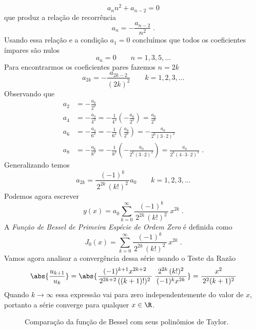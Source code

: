 \begin{example}
  \[
    a_n n^2 + a_{n-2} = 0
  \]
  que produz a relação de recorrência
  \[
    a_n = -\frac{a_{n-2}}{n^2} \;.
  \]
  Usando essa relação e a condição $a_1 = 0$ concluímos que todos
  os coeficientes ímpares são nulos
  \[
    a_n = 0 \qquad n = 1, 3, 5, \dots
  \]
  Para encontrarmos os coeficientes pares fazemos $n=2k$
  \[
    a_{2k} = -\frac{a_{2k-2}}{(2k)^2} \qquad k = 1, 2, 3, \dots
  \]
  Observando que
  \begin{align*}
    a_2 & = -\frac{a_0}{2^2} \\[3mm]
    a_4 & = -\frac{a_2}{4^2}
          = -\frac{1}{4^2}\left(-\frac{a_0}{2^2}\right)
          =  \frac{a_0}{2^6} \\[3mm]
    a_6 & = -\frac{a_4}{6^2}
          = -\frac{1}{6^2}\left(\frac{a_0}{2^6}\right)
          = -\frac{a_0}{2^6(3\cdot 2)^2} \\[3mm]
    a_8 & = -\frac{a_6}{8^2}
          = -\frac{1}{8^2}\left(-\frac{a_0}{2^6(3\cdot 2)^2}\right)
          =  \frac{a_0}{2^8(4\cdot 3\cdot 2)^2} \;.
  \end{align*}
  Generalizando temos
  \[
    a_{2k} = \frac{(-1)^k}{\,2^{2k}\,(k!)^2\,} a_0 \qquad k = 1, 2, 3, \dots
  \]
  Podemos agora escrever
  \[
    y(x) = a_0 \sum_{k=0}^\infty \frac{\,(-1)^k\,}{\,2^{2k}\,(k!)^2\,} \, x^{2k} \;.
  \]
  A \emph{Função de Bessel de Primeira Espécie de Ordem Zero} é definida como
  \[
    J_0(x) = \sum_{k=0}^\infty \frac{\,(-1)^k\,}{\,2^{2k}\,(k!)^2\,} \, x^{2k} \;.
  \]
  Vamos agora analisar a convergência dessa série usando o Teste da Razão
  \[
    \abs{\frac{u_{k+1}}{u_k}}
     = \abs{ \frac{\,(-1)^{k+1} x^{2k+2}\,}{\,2^{2k+2}\,((k+1)!)^2\,}\;
              \frac{\,2^{2k}\,(k!)^2\,}{\,(-1)^k x^{2k}\,} }
     = \frac{x^2}{\,2^2 (k+1)^2\,}
  \]
  Quando $k\to\infty$ essa expressão vai para zero independentemente do valor
  de $x$, portanto a série converge para qualquer $x\in\R$.
\end{example}

\begin{figure}
  \begin{center}%
    \vspace{-0.2\baselineskip}%
    \scalebox{0.9}{}%
    \vspace{-\baselineskip}%
  \end{center}
  \caption{Comparação da função de Bessel com seus polinômios de Taylor.}
  \label{fig:funcao_tayplor_bessel}
\end{figure}

